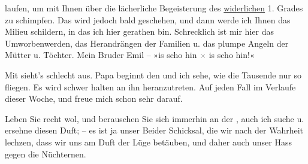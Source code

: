                laufen, um mit Ihnen über die lächerliche Begeisterung des \uline{widerlichen} 1. Grades zu schimpfen. Das wird jedoch bald geschehen, und dann
               werde ich Ihnen das Milieu
               schildern, in das ich hier gerathen bin. Schrecklich ist mir hier das Umworbenwerden,
               das Herandrängen der Familien u. das plumpe Angeln der Mütter u. Töchter. Mein Bruder
                  Emil – »is scho hin \textcolor{gray}{×} is scho hin!«\pend
           
\pstart
           Mit \label{K_L03105-4v}\label{K_L03105-4} sieht’s schlecht aus. Papa beginnt
               den \label{K_L03105-5v}\label{K_L03105-5} und
               ich sehe, wie die Tausende nur so fliegen. Es wird schwer halten an ihn
               heranzutreten. Auf jeden Fall \label{K_L03105-6v}\label{K_L03105-6} im Verlaufe dieser Woche, und freue mich schon sehr darauf.\pend
           
\pstart
           Leben Sie recht wol, und berauschen Sie sich immerhin an der \label{K_L03105-7v}\label{K_L03105-7}, auch ich suche u. ersehne diesen Duft; – es ist ja unser Beider Schicksal,
               die wir nach der Wahrheit lechzen, dass wir uns am Duft der Lüge betäuben, und daher
               auch unser Hass gegen die Nüchternen.\pend
           
